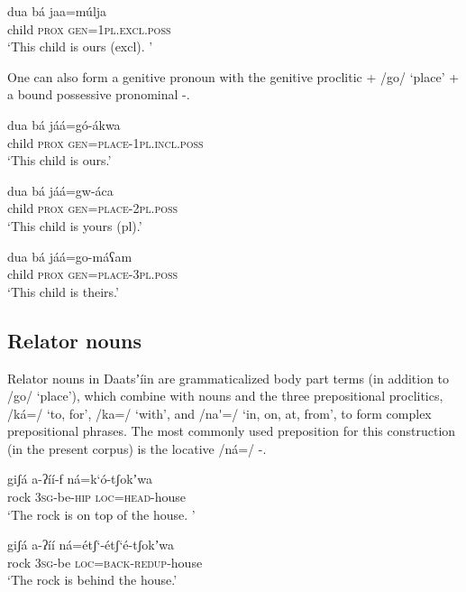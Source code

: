 \documentclass[output=paper]{langsci/langscibook}
\begin{document}
\ea\label{ex:ahlandc:59}
\gll
dua  bá  jaa=m\'{u}lja \\
child  \textsc{prox} \textsc{gen=1pl.excl.poss}  \\
\glt
‘This child is ours (excl). ’
\z

One can also form a genitive pronoun with the genitive proclitic + /go/ ‘place’ + a bound possessive pronominal -.

\ea\label{ex:ahlandc:60}
\gll
dua   bá       jáá=g\'{o}-ákwa \\
child \textsc{prox}  \textsc{gen}\textsc{=place-1pl.incl.poss} \\
\glt
‘This child is ours.’
\z

\ea\label{ex:ahlandc:61}
\gll 
dua   bá       jáá=gw-áca \\
child \textsc{prox} \textsc{gen}\textsc{=place-2pl.poss} \\
\glt
‘This child is yours (pl).’
\z

\ea\label{ex:ahlandc:62}
\gll
dua   bá       jáá=go-máʕam \\
child \textsc{prox} \textsc{gen}\textsc{=place-3pl.poss}  \\
\glt
‘This child is theirs.’
\z

\subsection{Relator nouns}\label{sec:ahlandc:10.2}

Relator nouns in Daatsʼíin are grammaticalized body part terms (in addition to /go/ ‘place’), which combine with nouns and the three prepositional proclitics, /ká=/ ‘to, for’, /ka=/ ‘with’, and /na\'{ }=/ ‘in, on, at, from’, to form complex prepositional phrases. The most commonly used preposition for this construction (in the present corpus) is the locative /ná=/ -. 

\ea\label{ex:ahlandc:63}
\gll
giʃá  a-ʔíí-f    ná=k‘\'{o}-tʃokʼwa \\
rock \textsc{3sg}{}-be-\textsc{hip}  \textsc{loc}\textsc{=head}{}-house \\
\glt
‘The rock is on top of the house. ’
\z

\ea\label{ex:ahlandc:64}
\gll
giʃá  a-ʔíí    ná=étʃ‘-étʃ‘é-tʃokʼwa \\
rock   3\textsc{sg}{}-be    \textsc{loc}=\textsc{back}{}-\textsc{redup}{}-house \\
\glt
‘The rock is behind the house.’
\z
\end{document}
